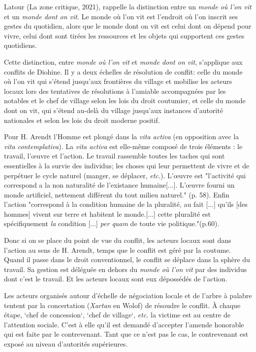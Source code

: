 Latour (La zone critique, 2021), rappelle la distinction entre  un \textit{monde où l'on vit} et un \textit{monde dont on vit}. Le monde où l'on vit  est l'endroit où l'on inscrit ses gestes du quotidien, alors que le monde dont on vit est  celui dont on dépend pour vivre, celui dont sont tirées les ressources et les objets qui supportent ces gestes quotidiens.

Cette distinction, entre \textit{monde où l'on vit} et \textit{monde dont on vit}, s'applique aux conflits de Diohine. Il y a deux échelles de résolution de conflit:  celle du monde où l'on vit qui s'étend jusqu'aux frontières du village et mobilise les acteurs locaux lors des tentatives de résolutions à l'amiable accompagnées par les notables et le chef de village selon les lois du droit coutumier,  et celle du monde dont on vit, qui s'étend au-delà du village jusqu'aux instances d'autorité nationales et selon les lois du droit moderne positif.

Pour H. Arendt\cite{arendt_condition_2020} l'Homme est plongé dans la \textit{vita activa} (en opposition avec la \textit{vita contemplativa}). La \textit{vita activa} est elle-même composé de trois éléments : le travail, l'\oe{}uvre et l'action. Le travail rassemble toutes les taches qui sont essentielles à la survie des individus; les choses qui leur permettent de vivre et de perpétuer le cycle naturel (manger, se déplacer, \textit{etc.}). L'\oe{}uvre est "l'activité qui correspond a la non naturalité de l'existance humaine[...]. L'\oe{}uvre fourni un monde artificiel, nettement différent du tout milieu naturel." (p. 58). Enfin l'action "correspond à la condition humaine de la pluralité, au fait [...] qu'ils [des hommes] vivent sur terre et habitent le monde.[...] cette pluralité est spécifiquement \textit{la} condition [...] \textit{per quam} de toute vie politique."(p.60).

Donc si on se place du point de vue du conflit, les acteurs locaux sont dans l'action au sens de H. Arendt, temps que le conflit est géré par la coutume. Quand il passe dans le droit conventionnel, le conflit se déplace dans la sphère du travail. Sa gestion est déléguée en dehors du \textit{monde où l'on vit} par des individus dont c'est le travail. Et les acteurs locaux sont eux dépossédés de l'action.

Les acteurs organisés autour d’échelle de négociation locale et de l'arbre à palabre tentent par la concertation (\textit{Xartan} en Wolof) de résoudre le conflit. À chaque étape, `chef de concession`, `chef de village`, \textit{etc.} la victime est au centre de l'attention sociale. C'est à elle qu'il est demandé d'accepter l'amende honorable qui est faite par le contrevenant. Tant que ce n'est pas le cas, le contrevenant est exposé au niveau d'autorités supérieures.

